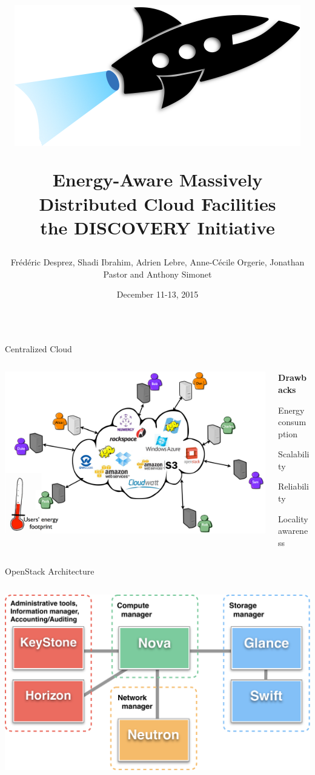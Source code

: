 \documentclass[final,t]{beamer}
\title{\hspace{0.025\linewidth}\parbox{0.10\linewidth}{\includegraphics[width=1.\linewidth]{images/rocket.png}}\hspace{0.1\linewidth} \parbox{0.75\linewidth}{%
\Huge Energy-Aware Massively Distributed Cloud Facilities\\ the DISCOVERY Initiative}}
\author[]{\vspace{0.5cm} Fr\'ed\'eric Desprez, Shadi Ibrahim, Adrien Lebre, Anne-C\'ecile Orgerie, Jonathan Pastor and Anthony Simonet}
\institute[Discovery]{\vspace{-0.2cm}{\Large INRIA, CNRS, France - \url{http://beyondtheclouds.github.io}}\vspace{0.2cm}}
\date[Dec. 11-13, 2015]{December 11-13, 2015}
\begin{document}
\begin{frame}[fragile]{}
  \begin{columns}[t]
     \begin{column}{.49\linewidth}

      \begin{block}{\Large Centralized Cloud}
        \begin{columns}[T]
        \begin{column}{0.75\linewidth}
	\includegraphics[width=0.9\linewidth]{images/cloud-centralise.png}
        \end{column}
        \begin{column}{0.22\linewidth}
	\textbf{\Large Drawbacks}
        \begin{itemize}
        \begin{Large}
         \item Energy consumption
         \item Scalability
         \item Reliability
         \item Locality awareness
        \end{Large}
        \end{itemize}
        \end{column}
        \end{columns}
      \end{block}


     \begin{block}{\Large OpenStack Architecture}
        \begin{columns}[T]
        \begin{column}{0.95\linewidth}
	\centering
	\includegraphics[width=.85\linewidth]{images/OpenStack_architecture.pdf}


\end{column}
\end{columns}
\end{block}
\end{column}
\end{columns}
\end{frame}
\end{document}
